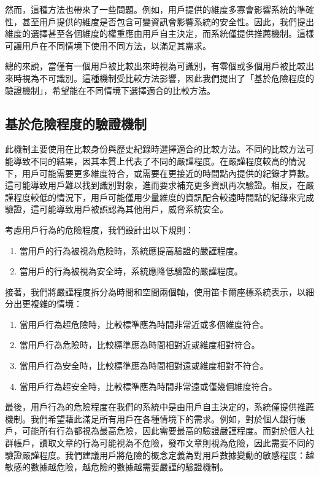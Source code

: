 然而，這種方法也帶來了一些問題。例如，用戶提供的維度多寡會影響系統的準確性，甚至用戶提供的維度是否包含可變資訊會影響系統的安全性。因此，我們提出維度的選擇甚至各個維度的權重應由用戶自主決定，而系統僅提供推薦機制。這樣可讓用戶在不同情境下使用不同方法，以滿足其需求。

總的來說，當僅有一個用戶被比較出來時視為可識別，有零個或多個用戶被比較出來時視為不可識別。這種機制受比較方法影響，因此我們提出了「基於危險程度的驗證機制」，希望能在不同情境下選擇適合的比較方法。
\subsection{基於危險程度的驗證機制}
此機制主要使用在比較身份與歷史紀錄時選擇適合的比較方法。不同的比較方法可能導致不同的結果，因其本質上代表了不同的嚴謹程度。在嚴謹程度較高的情況下，用戶可能需要更多維度符合，或需要在更接近的時間點內提供的紀錄才算數。這可能導致用戶難以找到識別對象，進而要求補充更多資訊再次驗證。相反，在嚴謹程度較低的情況下，用戶可能僅用少量維度的資訊配合較遠時間點的紀錄來完成驗證，這可能導致用戶被誤認為其他用戶，威脅系統安全。

考慮用戶行為的危險程度，我們設計出以下規則：
\begin{enumerate}
  \item 當用戶的行為被視為危險時，系統應提高驗證的嚴謹程度。
  \item 當用戶的行為被視為安全時，系統應降低驗證的嚴謹程度。
\end{enumerate}

接著，我們將嚴謹程度拆分為時間和空間兩個軸，使用笛卡爾座標系統表示，以細分出更複雜的情境：
\begin{enumerate}
  \item 當用戶行為超危險時，比較標準應為時間非常近或多個維度符合。
  \item 當用戶行為危險時，比較標準應為時間相對近或維度相對符合。
  \item 當用戶行為安全時，比較標準應為時間相對遠或維度相對不符合。
  \item 當用戶行為超安全時，比較標準應為時間非常遠或僅幾個維度符合。
\end{enumerate}

最後，用戶行為的危險程度在我們的系統中是由用戶自主決定的，系統僅提供推薦機制。我們希望藉此滿足所有用戶在各種情境下的需求。例如，對於個人銀行帳戶，可能所有行為都視為最高危險，因此需要最高的驗證嚴謹程度。而對於個人社群帳戶，讀取文章的行為可能視為不危險，發布文章則視為危險，因此需要不同的驗證嚴謹程度。我們建議用戶將危險的概念定義為對用戶數據變動的敏感程度：越敏感的數據越危險，越危險的數據越需要嚴謹的驗證機制。
